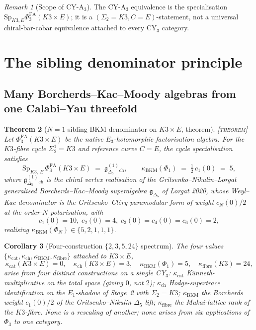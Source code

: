 \documentclass[11pt]{amsart}
\providecommand{\gDelta}{\mathfrak{g}_{\Delta_5}}
\providecommand{\Sp}{\mathrm{Sp}}
\providecommand{\Eone}{E_1}
\providecommand{\Ethree}{E_3}
\providecommand{\kch}{\kappa_{\mathrm{ch}}}
\providecommand{\kcat}{\kappa_{\mathrm{cat}}}
\providecommand{\kBKM}{\kappa_{\mathrm{BKM}}}
\providecommand{\kfib}{\kappa_{\mathrm{fibre}}}
\providecommand{\Phifun}{\Phi}
\providecommand{\PhiFA}{\Phi^{\mathrm{FA}}}
\providecommand{\ClaimStatusTheorem}{\textsc{[theorem]}}
\theoremstyle{plain}
\newtheorem{theorem}{Theorem}[section]
\newtheorem{corollary}[theorem]{Corollary}
\theoremstyle{definition}
\theoremstyle{remark}
\newtheorem{remark}[theorem]{Remark}
\begin{document}
\begin{remark}[Scope of CY-A$_3$]
The CY-A$_3$ equivalence is the specialisation
$\Sp_{K3,E}\PhiFA_3(K3\times E)$; it is a $(\Sigma_2=K3,C=E)$-statement,
not a universal chiral-bar-cobar equivalence attached to every
CY$_3$ category.
\end{remark}

\section{The sibling denominator principle}

\subsection{Many Borcherds--Kac--Moody algebras from one Calabi--Yau threefold}

\begin{theorem}[$N=1$ sibling BKM denominator on $K3\times E$, theorem]
\label{thm:many-BKM-N1}
\ClaimStatusTheorem{}\;
Let $\PhiFA_3(K3\times E)$ be the native $\Ethree$-holomorphic
factorisation algebra. For the $K3$-fibre cycle
$\Sigma_2^1=K3$ and reference curve $C=E$, the cycle specialisation
satisfies
\[
\Sp_{K3,\, E}\,\PhiFA_3(K3\times E)\;=\;\gDelta^{(1)}_{\mathrm{ch}},
\qquad
\kBKM(\Phi_1)\;=\;\tfrac12\,c_1(0)\;=\;5,
\]
where $\gDelta^{(1)}_{\mathrm{ch}}$ is the chiral vertex realisation of
the Gritsenko--Nikulin--Lorgat generalised Borcherds--Kac--Moody
superalgebra $\gDelta$ of Lorgat 2020, whose Weyl--Kac
denominator is the Gritsenko--Cl\'ery paramodular form of weight
$c_N(0)/2$ at the order-$N$ polarisation, with
\[
c_1(0)=10,\; c_2(0)=4,\; c_3(0)=c_4(0)=c_6(0)=2,
\]
realising $\kBKM(\Phi_N)\in\{5,2,1,1,1\}$.
\end{theorem}

\begin{corollary}[Four-construction $\{2,3,5,24\}$ spectrum]
\label{cor:2-3-5-24}
The four values $\{\kcat, \kch, \kBKM, \kfib\}$ attached to
$K3\times E$,
\[
\kcat(K3\times E)=0,\quad
\kch(K3\times E)=3,\quad
\kBKM(\Phi_1)=5,\quad
\kfib(K3)=24,
\]
arise from four \emph{distinct} constructions on a single CY$_3$:
$\kcat$ K\"unneth-multiplicative on the total space (giving $0$, not
$2$); $\kch$ Hodge-supertrace identification on the $\Eone$-shadow
of Stage~2 with $\Sigma_2=K3$; $\kBKM$ the Borcherds weight $c_1(0)/2$
of the Gritsenko--Nikulin $\Delta_5$ lift; $\kfib$ the Mukai-lattice
rank of the $K3$-fibre. None is a rescaling of another; none arises
from six applications of $\Phifun_3$ to one category.
\end{corollary}
\end{document}
